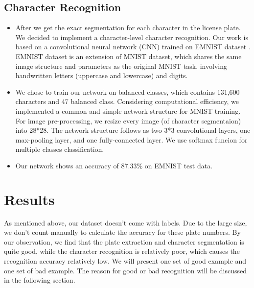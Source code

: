 \documentclass{article}
\begin{document}
\begin{spacing}{1.0}
\subsection{Character Recognition}
\begin{itemize}
	\item After we get the exact segmentation for each character in the license plate. We decided to implement a character-level character recognition. Our work is based on a convolutional neural network (CNN) trained on EMNIST dataset \cite{DBLP:journals/corr/CohenATS17}. EMNIST dataset is an extension of MNIST dataset, which shares the same image structure and parameters as the original MNIST task, involving handwritten letters (uppercase and lowercase) and digits.
	\item  We chose to train our network on balanced classes, which contains 131,600 characters and 47 balanced class. Considering computational efficiency, we implemented a common and simple network structure for MNIST training. For image pre-processing, we resize every image (of character segmentaion) into 28*28. The network structure follows as two 3*3 convolutional layers, one max-pooling layer, and one fully-connected layer. We use softmax funcion for multiple classes classification. 
	\item Our network shows an accuracy of 87.33\% on EMNIST test data. 
	
\end{itemize}

\section{Results}
As mentioned above, our dataset doesn't come with labels. Due to the large size, we don't count manually to calculate the accuracy for these plate numbers. By our observation, we find that the plate extraction and character segmentation is quite good, while the character recognition is relatively poor, which causes the recognition accuracy relatively low. We will present one set of good example and one set of bad example. The reason for good or bad recognition will be discussed in the following section.


\end{spacing}
\end{document}
